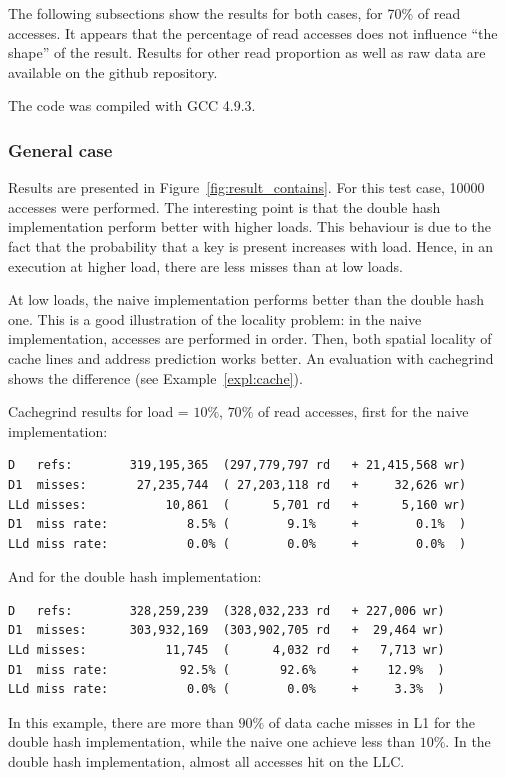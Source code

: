 \documentclass[oneside]{article}
\begin{document}
The following subsections show the results for both cases, for 70\% of read accesses. It appears that the percentage of read accesses does not influence ``the shape'' of the result. Results for other read proportion as well as raw data are available on the github repository.

The code was compiled with GCC 4.9.3.
\subsubsection{General case}
Results are presented in Figure~\ref{fig:result_contains}. For this test case, 10000 accesses were performed. The interesting point is that the double hash implementation perform better with higher loads. This behaviour is due to the fact that the probability that a key is present increases with load. Hence, in an execution at higher load, there are less misses than at low loads. 

At low loads, the naive implementation performs better than the double hash one. This is a good illustration of the locality problem: in the naive implementation, accesses are performed in order. Then, both spatial locality of cache lines and address prediction works better. An evaluation with cachegrind shows the difference (see Example~\ref{expl:cache}).
\begin{example}
	\label{expl:cache}
Cachegrind results for load = $10\%$, $70\%$ of read accesses, first for the naive implementation: 
	\begin{verbatim}
D   refs:        319,195,365  (297,779,797 rd   + 21,415,568 wr)
D1  misses:       27,235,744  ( 27,203,118 rd   +     32,626 wr)
LLd misses:           10,861  (      5,701 rd   +      5,160 wr)
D1  miss rate:           8.5% (        9.1%     +        0.1%  )
LLd miss rate:           0.0% (        0.0%     +        0.0%  )
	\end{verbatim}
And for the double hash implementation: 
	\begin{verbatim}
D   refs:        328,259,239  (328,032,233 rd   + 227,006 wr)
D1  misses:      303,932,169  (303,902,705 rd   +  29,464 wr)
LLd misses:           11,745  (      4,032 rd   +   7,713 wr)
D1  miss rate:          92.5% (       92.6%     +    12.9%  )
LLd miss rate:           0.0% (        0.0%     +     3.3%  )
	\end{verbatim}

In this example, there are more than $90\%$ of data cache misses in L1 for the double hash implementation, while the naive one achieve less than $10\%$. In the double hash implementation, almost all accesses hit on the LLC.
\end{example}
\end{document}
